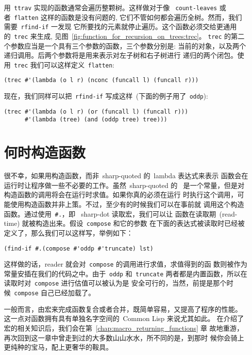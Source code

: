 用~\texttt{ttrav} 实现的函数通常会遍历整颗树。这样做对于像
~\texttt{count-leaves} 或者~\texttt{flatten} 这样的函数是没有问题的,
它们不管如何都会遍历全树。然而，我们需要~\texttt{rfind-if} 一发现
它所要找的元素就停止遍历。这个函数必须交给更通用的~\texttt{trec} 来生成,
见图~\ref{fig:function_for_recursion_on_trees:trec}。
\verb|trec| 的第二个参数应当是一个具有三个参数的函数，三个参数分别是:
当前的对象，以及两个递归调用。后两个参数将是用来表示对左子树和右子树进行
递归的两个闭包。使用~\verb|trec| 我们可以这样定义~\verb|flatten|:
\begin{lstlisting}
(trec #'(lambda (o l r) (nconc (funcall l) (funcall r)))
\end{lstlisting}
现在，我们同样可以把~\verb|rfind-if| 写成这样~(下面的例子用了~\verb|oddp|):
\begin{lstlisting}
(trec #'(lambda (o l r) (or (funcall l) (funcall r)))
      #'(lambda (tree) (and (oddp tree) tree)))
\end{lstlisting}

\section{何时构造函数}
\label{sec:when_to_build_functions}

很不幸，如果用构造函数，而非~sharp-quoted 的~lambda 表达式来表示
函数会在运行时让程序做一些不必要的工作。虽然~sharp-quoted 的~\lexpr
是一个常量，但是对构造函数的调用将会在运行时求值。如果你真的必须在运行
时执行这个调用，可能使用构造函数并非上策。不过，至少有的时候我们可以在事前就
调用这个构造函数。通过使用~\verb|#.|，即
~sharp-dot 读取宏，我们可以让
函数在读取期~(read-time) 就被构造出来。假设~\verb|compose| 和它的参数
在下面的表达式被读取时已经被定义了，那么我们可以这样写，举例如下：
\begin{lstlisting}
(find-if #.(compose #'oddp #'truncate) lst)
\end{lstlisting}
这样做的话，reader 就会对~\verb|compose| 的调用进行求值，求值得到的函
数则被作为常量安插在我们的代码之中。由于~\verb|oddp| 和~\verb|truncate| 
两者都是内置函数，所以在读取时对~\verb|compose| 进行估值可以被认为是
安全可行的，当然，前提是那个时候~\verb|compose| 自己已经加载了。

一般而言，由宏来完成函数复合或者合并，既简单容易，又提高了程序的性能。
这一点对函数拥有具有单独名字空间的~Common Lisp 来说尤其如此。
在介绍了宏的相关知识后，我们会在第~\ref{chap:macro_returning_functions} 章
故地重游，再次回到这一章中曾走到过的大多数山山水水，所不同的是，到那时
候你会骑上更纯种的宝马，配上更奢华的鞍具。

